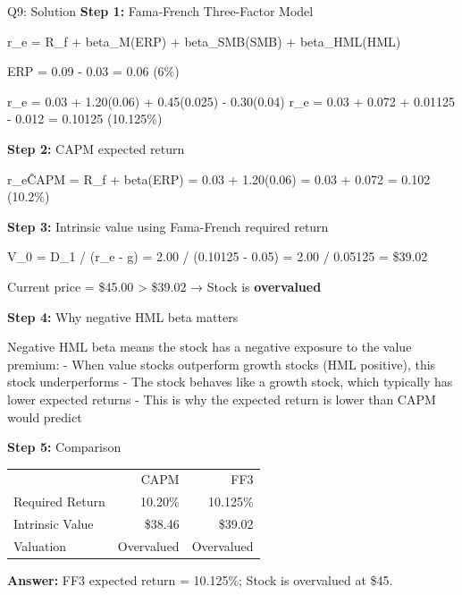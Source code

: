 \documentclass{beamer}
\renewcommand{\scriptsize}{\fontsize{6pt}{7pt}\selectfont}
\begin{document}
	\begin{frame}{Q9: Solution}
		\scriptsize
		\textbf{Step 1:} Fama-French Three-Factor Model
		
		r\_e = R\_f + beta\_M(ERP) + beta\_SMB(SMB) + beta\_HML(HML)
		
		ERP = 0.09 - 0.03 = 0.06 (6\%)
		
		r\_e = 0.03 + 1.20(0.06) + 0.45(0.025) - 0.30(0.04)
		r\_e = 0.03 + 0.072 + 0.01125 - 0.012 = 0.10125 (10.125\%)
		
		\vspace{2pt}
		\textbf{Step 2:} CAPM expected return
		
		r\_e\^{CAPM} = R\_f + beta(ERP) = 0.03 + 1.20(0.06) = 0.03 + 0.072 = 0.102 (10.2\%)
		
		\vspace{2pt}
		\textbf{Step 3:} Intrinsic value using Fama-French required return
		
		V\_0 = D\_1 / (r\_e - g) = 2.00 / (0.10125 - 0.05) = 2.00 / 0.05125 = \$39.02
		
		Current price = \$45.00 > \$39.02 → Stock is \textbf{overvalued}
		
		\vspace{2pt}
		\textbf{Step 4:} Why negative HML beta matters
		
		Negative HML beta means the stock has a negative exposure to the value premium:
		- When value stocks outperform growth stocks (HML positive), this stock underperforms
		- The stock behaves like a growth stock, which typically has lower expected returns
		- This is why the expected return is lower than CAPM would predict
		
		\vspace{2pt}
		\textbf{Step 5:} Comparison
		
		\begin{tabular}{lrr}
			& CAPM & FF3 \\
			Required Return & 10.20\% & 10.125\% \\
			Intrinsic Value & \$38.46 & \$39.02 \\
			Valuation & Overvalued & Overvalued \\
		\end{tabular}
		
		\textbf{Answer:} FF3 expected return = 10.125\%; Stock is overvalued at \$45.
	\end{frame}
	
\end{document}

